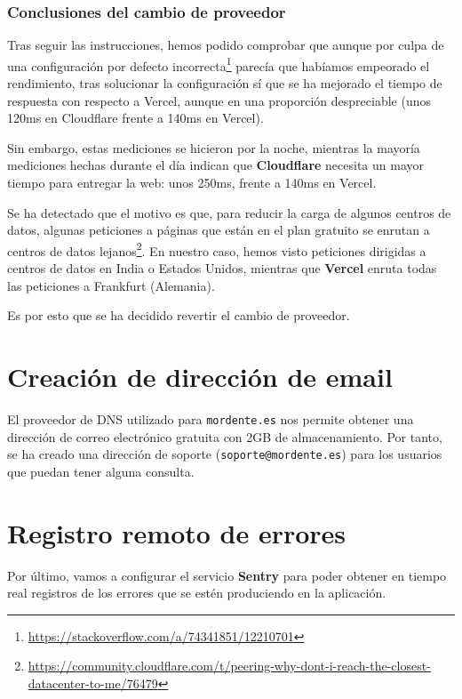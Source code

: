 \subsubsection{Conclusiones del cambio de proveedor}

Tras seguir las instrucciones, hemos podido comprobar que aunque por culpa de una configuración por defecto incorrecta\footnote{\url{https://stackoverflow.com/a/74341851/12210701}} parecía que habíamos empeorado el rendimiento, tras solucionar la configuración sí que se ha mejorado el tiempo de respuesta con respecto a Vercel, aunque en una proporción despreciable (unos 120ms en Cloudflare frente a 140ms en Vercel).

Sin embargo, estas mediciones se hicieron por la noche, mientras la mayoría mediciones hechas durante el día indican que \textbf{Cloudflare} necesita un mayor tiempo para entregar la web: unos 250ms, frente a 140ms en Vercel.

Se ha detectado que el motivo es que, para reducir la carga de algunos centros de datos, algunas peticiones a páginas que están en el plan gratuito se enrutan a centros de datos lejanos\footnote{\url{https://community.cloudflare.com/t/peering-why-dont-i-reach-the-closest-datacenter-to-me/76479}}. En nuestro caso, hemos visto peticiones dirigidas a centros de datos en India o Estados Unidos, mientras que \textbf{Vercel} enruta todas las peticiones a Frankfurt (Alemania).

Es por esto que se ha decidido revertir el cambio de proveedor.


\section{Creación de dirección de email}

El proveedor de DNS utilizado para \texttt{mordente.es} nos permite obtener una dirección de correo electrónico gratuita con 2GB de almacenamiento. Por tanto, se ha creado una dirección 
de soporte (\texttt{soporte@mordente.es}) para los usuarios que puedan tener alguna consulta.

\section{Registro remoto de errores}

Por último, vamos a configurar el servicio \textbf{Sentry} para poder obtener en tiempo real registros de los errores que se estén produciendo en la aplicación.

